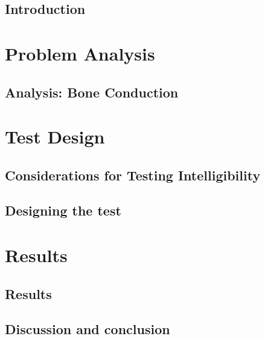 \glsresetall
 \graphicspath{{figures/analysing/}}
\chapter{Introduction}\label{ch:intro}



\part{Problem Analysis}\label{pt:analysis} \glsresetall
\graphicspath{{figures/analysis/}}
\chapter{Analysis: Bone Conduction}\label{ch:bone_conductors}







\part{Test Design}\label{pt:design} 
\graphicspath{{figures/design/}}	
\chapter{Considerations for Testing Intelligibility}\label{ch:test_considerations}





\chapter{Designing the test}\label{ch:test_design}





\part{Results}\label{pt:test}
\chapter{Results}
\graphicspath{{figures/tests/}}


\chapter{Discussion and conclusion}




